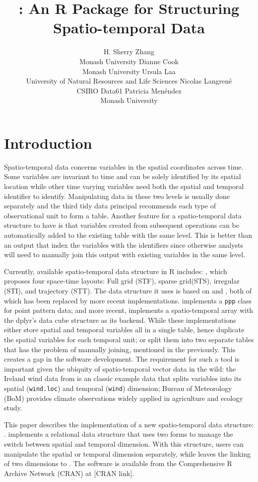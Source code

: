 \documentclass[
]{jss}
\author{
H. Sherry Zhang\\Monash University \And Dianne Cook\\Monash University
\AND Ursula Laa\\University of Natural Resources and Life Sciences
\AND Nicolas Langrené\\CSIRO Data61 \AND Patricia
Menéndez\\Monash University \AND
}
\title{\pkg{cubble}: An R Package for Structuring Spatio-temporal Data}
\begin{document}
\newpage

\hypertarget{introduction}{%
\section{Introduction}\label{introduction}}

Spatio-temporal data concerns variables in the spatial coordinates
across time. Some variables are invariant to time and can be solely
identified by its spatial location while other time varying variables
need both the spatial and temporal identifier to identify. Manipulating
data in these two levels is usually done separately and the third tidy
data principal \citep{tidydata} recommends each type of observational
unit to form a table. Another feature for a spatio-temporal data
structure to have is that variables created from subsequent operations
can be automatically added to the existing table with the same level.
This is better than an output that index the variables with the
identifiers since otherwise analysts will need to manually join this
output with existing variables in the same level.

Currently, available spatio-temporal data structure in R includes:
 \citep{spacetime}, which proposes four space-time
layouts: Full grid (STF), sparse grid(STS), irregular (STI), and
trajectory (STT). The data structure it uses is based on 
\citep{sp} and  \citep{xts}, both of which has been replaced by
more recent implementations.  \citep{spatstat} implements
a \texttt{ppp} class for point pattern data; and more recent,
 \citep{stars} implements a spatio-temporal array with the
dplyr's data cube structure  \citep{cubelyr} as its
backend. While these implementations either store spatial and temporal
variables all in a single table, hence duplicate the spatial variables
for each temporal unit; or split them into two separate tables that has
the problem of manually joining, mentioned in the previously. This
creates a gap in the software development. The requirement for such a
tool is important given the ubiquity of spatio-temporal vector data in
the wild: the Ireland wind data from  is an classic example
data that splits variables into its spatial (\texttt{wind.loc}) and
temporal (\texttt{wind}) dimension; Bureau of Meteorology (BoM) provides
climate observations widely applied in agriculture and ecology study.
\newline

This paper describes the implementation of a new spatio-temporal data
structure: .  implements a relational data
structure that uses two forms to manage the switch between spatial and
temporal dimension. With this structure, users can manipulate the
spatial or temporal dimension separately, while leaves the linking of
two dimensions to . The software is available from the
Comprehensive R Archive Network (CRAN) at {[}CRAN link{]}. \newline
\end{document}
